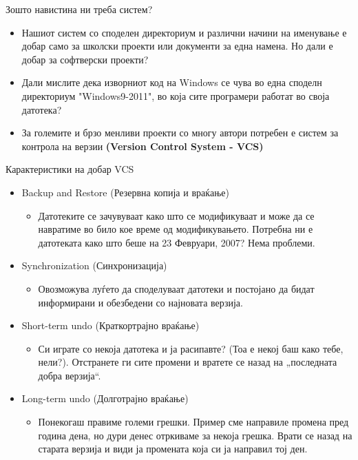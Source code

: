 \begin{frame}{Зошто навистина ни треба систем?}
\begin{itemize}
    \item Нашиот систем со споделен директориум и различни начини на именување е
    добар само за школски проекти или документи за една намена. Но дали е добар за софтверски
  проекти?
  \pause
    \item Дали мислите дека изворниот код на Windows се чува во една споделн
    директориум "Windows9-2011", во која сите програмери работат во своја
    датотека?
  \pause
    \item За големите и брзо менливи проекти со многу автори потребен е систем
    за контрола на верзии \textbf{(Version Control System - VCS)}
\end{itemize}
\end{frame}

\begin{frame}{Карактеристики на добар VCS}
\begin{itemize}
    \item Backup and Restore (Резервна копија и враќање)
    \begin{itemize} 
        \item Датотеките се зачувуваат како што се модификуваат и може да се
        навратиме во било кое време од модификувањето. Потребна ни е датотеката
        како што беше на 23 Февруари, 2007? Нема проблеми.
    \end{itemize}
    \pause
    \item Synchronization (Синхронизација)
    \begin{itemize} 
        \item Овозможува луѓето да споделуваат датотеки и постојано да бидат
        информирани и обезбедени со најновата верзија.
    \end{itemize}
    \pause
    \item Short-term undo (Краткортрајно враќање)
    \begin{itemize} 
        \item Си играте со некоја датотека и ја расипавте? (Тоа е некој
        баш како тебе, нели?). Отстранете ги сите промени и вратете се
        назад на „последната добра верзија“.
    \end{itemize}
    \pause
    \item Long-term undo (Долготрајно враќање)
    \begin{itemize} 
        \item Понекогаш правиме големи грешки. Пример сме направиле
        промена пред година дена, но дури денес отркиваме за некоја
        грешка. Врати се назад на старата верзија и види ја промената
        која си ја направил тој ден.
    \end{itemize}
\end{itemize}
\end{frame}

